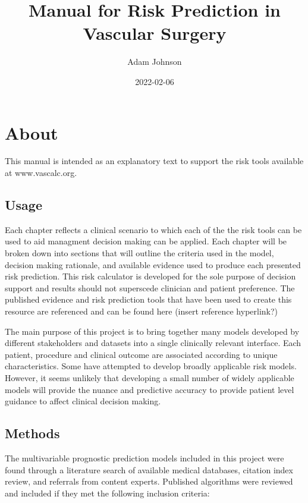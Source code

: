 \documentclass[
]{book}
\title{Manual for Risk Prediction in Vascular Surgery}
\author{Adam Johnson}
\date{2022-02-06}
\begin{document}
\maketitle

{
\setcounter{tocdepth}{1}
\tableofcontents
}
\hypertarget{about}{%
\chapter{About}\label{about}}

This manual is intended as an explanatory text to support the risk tools available at www.vascalc.org.

\hypertarget{usage}{%
\section{Usage}\label{usage}}

Each chapter reflects a clinical scenario to which each of the the risk tools can be used to aid managment decision making can be applied. Each chapter will be broken down into sections that will outline the criteria used in the model, decision making rationale, and available evidence used to produce each presented risk prediction. This risk calculator is developed for the sole purpose of decision support and results should not superscede clinician and patient preference. The published evidence and risk prediction tools that have been used to create this resource are referenced and can be found here (insert reference hyperlink?)

The main purpose of this project is to bring together many models developed by different stakeholders and datasets into a single clinically relevant interface. Each patient, procedure and clinical outcome are associated according to unique characteristics. Some have attempted to develop broadly applicable risk models.\citep{meguidSurgicalRiskPreoperative2016c, meguidSurgicalRiskPreoperative2016d, meguidSurgicalRiskPreoperative2016e} However, it seems unlikely that developing a small number of widely applicable models will provide the nuance and predictive accuracy to provide patient level guidance to affect clinical decision making.

\hypertarget{methods}{%
\section{Methods}\label{methods}}

The multivariable prognostic prediction models included in this project were found through a literature search of available medical databases, citation index review, and referrals from content experts. Published algorithms were reviewed and included if they met the following inclusion criteria:
\end{document}

